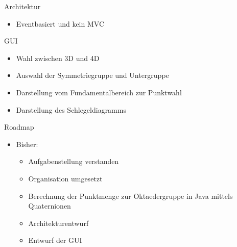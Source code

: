 \documentclass[ucs,11pt]{beamer}
\begin{document}
\begin{frame}{Architektur}
	\begin{itemize}
	\item Eventbasiert und kein MVC
	\end{itemize}
\end{frame}

\begin{frame}{GUI}
	\begin{itemize}
	\item Wahl zwischen 3D und 4D
	\item Auswahl der Symmetriegruppe und Untergruppe
	\item Darstellung vom Fundamentalbereich zur Punktwahl
	\item Darstellung des Schlegeldiagramms
	\end{itemize}
\end{frame}


\begin{frame}{Roadmap}
  \begin{itemize}
    \item Bisher:
      	\begin{itemize}
        	\item Aufgabenstellung verstanden
	\item Organisation umgesetzt
	\item Berechnung der Punktmenge zur Oktaedergruppe in Java mittels Quaternionen
	\item Architekturentwurf
	\item Entwurf der GUI
     	 \end{itemize}
  \end{itemize}
\end{frame}
\end{document}
